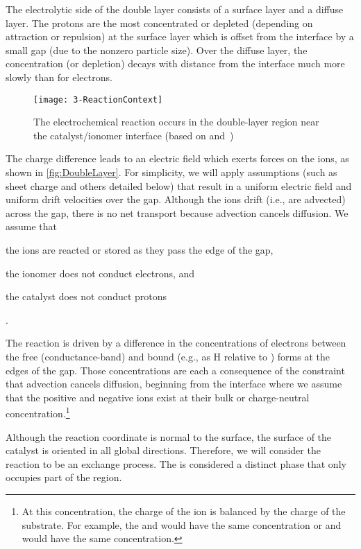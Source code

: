The electrolytic side of the double layer consists of a surface layer and a diffuse layer.  The protons are the most concentrated or depleted (depending on attraction or repulsion) at the surface layer which is offset from the interface by a small gap (due to the nonzero particle size).  Over the diffuse layer, the concentration (or depletion) decays with distance from the interface much more slowly than for electrons.

\begin{figure}[htbp]
  \texttt{[image: 3-ReactionContext]}%
  \caption[Location of the electrochemical reaction]{The electrochemical reaction occurs in the double-layer region near the catalyst\slash{}ionomer interface (based on \cite[p. 74]{Larminie2003} and~\cite{Mazumder2003a})}%
  \label{fig:ReactionContext}
\end{figure}

The charge difference leads to an electric field which exerts forces on the ions, as shown in \autoref{fig:DoubleLayer}.  For simplicity, we will apply assumptions (such as sheet charge and others detailed below) that result in a uniform electric field and uniform drift velocities  over the gap.  Although the ions drift (i.e., are advected) across the gap, there is no net transport because advection cancels diffusion.  We assume that \begin{inparaenum}[(1)]\item the ions are reacted or stored as they pass the edge of the gap, \item the ionomer does not conduct electrons, and \item the catalyst does not conduct protons\end{inparaenum}.  

The reaction is driven by a difference in the concentrations of electrons between the free (conductance-band) and bound (e.g., as H relative to ) forms at the edges of the gap.  Those concentrations are each a consequence of the constraint that advection cancels diffusion, beginning from the interface where we assume that the positive and negative ions exist at their bulk or charge-neutral concentration.\footnote{At this concentration, the charge of the ion is balanced by the charge of the substrate.  For example, the  and  would have the same concentration or  and  would have the same concentration.}  

Although the reaction coordinate is normal to the surface, the surface of the catalyst is oriented in all global directions.  Therefore, we will consider the reaction to be an exchange process.  The  is considered a distinct phase that only occupies part of the region.

